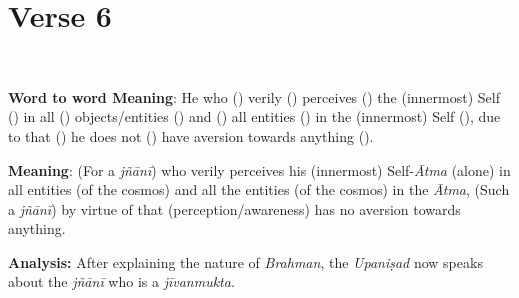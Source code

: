 \chapter{Verse 6}

\\

\textbf{Word to word Meaning}: He who () verily () perceives () the (innermost) Self () in all () objects/entities () and () all entities () in the (innermost) Self (), due to that () he does not () have aversion towards anything ().

\textbf{Meaning}: (For a \emph{jñānī}) who verily perceives his (innermost) Self-\emph{Ātma} (alone) in all entities (of the cosmos) and all the entities (of the cosmos) in the \emph{Ātma}, (Such a \emph{jñānī}) by virtue of that (perception/awareness) has no aversion towards anything.

\textbf{Analysis:} After explaining the nature of \emph{Brahman}, the \emph{Upaniṣad} now speaks about the \emph{jñānī} who is a \emph{jīvanmukta}.

